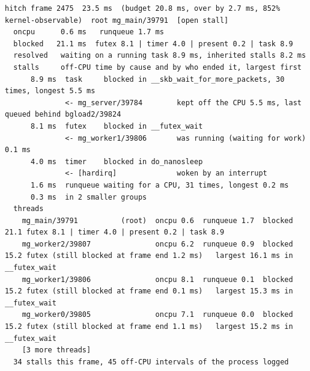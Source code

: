 \begin{lrbox}{\recordbox}
\footnotesize
\begin{minipage}{1.42\textwidth}
\begin{verbatim}
hitch frame 2475  23.5 ms  (budget 20.8 ms, over by 2.7 ms, 852% kernel-observable)  root mg_main/39791  [open stall]
  oncpu      0.6 ms   runqueue 1.7 ms
  blocked   21.1 ms  futex 8.1 | timer 4.0 | present 0.2 | task 8.9
  resolved   waiting on a running task 8.9 ms, inherited stalls 8.2 ms
  stalls     off-CPU time by cause and by who ended it, largest first
      8.9 ms  task     blocked in __skb_wait_for_more_packets, 30 times, longest 5.5 ms
              <- mg_server/39784        kept off the CPU 5.5 ms, last queued behind bgload2/39824
      8.1 ms  futex    blocked in __futex_wait
              <- mg_worker1/39806       was running (waiting for work) 0.1 ms
      4.0 ms  timer    blocked in do_nanosleep
              <- [hardirq]              woken by an interrupt
      1.6 ms  runqueue waiting for a CPU, 31 times, longest 0.2 ms
      0.3 ms  in 2 smaller groups
  threads
    mg_main/39791          (root)  oncpu 0.6  runqueue 1.7  blocked 21.1 futex 8.1 | timer 4.0 | present 0.2 | task 8.9
    mg_worker2/39807               oncpu 6.2  runqueue 0.9  blocked 15.2 futex (still blocked at frame end 1.2 ms)   largest 16.1 ms in __futex_wait
    mg_worker1/39806               oncpu 8.1  runqueue 0.1  blocked 15.2 futex (still blocked at frame end 0.1 ms)   largest 15.3 ms in __futex_wait
    mg_worker0/39805               oncpu 7.1  runqueue 0.0  blocked 15.2 futex (still blocked at frame end 1.1 ms)   largest 15.2 ms in __futex_wait
    [3 more threads]
  34 stalls this frame, 45 off-CPU intervals of the process logged
\end{verbatim}
\end{minipage}
\end{lrbox}
